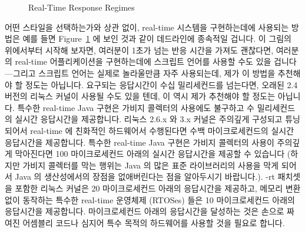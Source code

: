 \begin{figure}[tb]
\centering
{}
\caption{Real-Time Response Regimes}
\label{fig:advsync:Real-Time Response Regimes}
\end{figure}

어떤 스타일을 선택하는가와 상관 없이, real-time 시스템을 구현하는데에 사용되는
방법은 예를 들면
Figure~\ref{fig:advsync:Real-Time Response Regimes} 에 보인 것과 같이
데드라인에 종속적일 겁니다.
이 그림의 위에서부터 시작해 보자면, 여러분이 1초가 넘는 반응 시간을 가져도
괜찮다면, 여러분의 real-time 어플리케이션을 구현하는데에 스크립트 언어를 사용할
수도 있을 겁니다---그리고 스크립트 언어는 실제로 놀라울만큼 자주 사용되는데,
제가 이 방법을 추천해야 할 정도는 아닙니다.
요구되는 응답시간이 수십 밀리세컨드를 넘는다면, 오래된 2.4 버전의 리눅스 커널이
사용될 수도 있을 텐데, 이 역시 제가 추천해야 할 정도는 아닙니다.
특수한 real-time Java 구현은 가비지 콜렉터의 사용에도 불구하고 수 밀리세컨드의
실시간 응답시간을 제공합니다.
리눅스 2.6.x 와 3.x 커널은 주의깊게 구성되고 튜닝되어서 real-time 에 친화적인
하드웨어서 수행된다면 수백 마이크로세컨드의 실시간 응답시간을 제공합니다.
특수한 real-time Java 구현은 가비지 콜렉터의 사용이 주의깊게 막아진다면 100
마이크로세컨드 아래의 실시간 응답시간을 제공할 수 있습니다
(하지만 가비지 콜렉터를 막는 행위는 Java 의 많은 표준 라이브러리의 사용을 막게
되어서 Java 의 생산성에서의 장점을 없애버린다는 점을 알아두시기 바랍니다.).
-rt 패치셋을 포함한 리눅스 커널은 20 마이크로세컨드 아래의 응답시간을 제공하고,
메모리 변환 없이 동작하는 특수한 real-time 운영체제 (RTOSes) 들은 10
마이크로세컨드 아래의 응답시간을 제공합니다.
마이크로세컨드 아래의 응답시간을 달성하는 것은 손으로 짜여진 어셈블리 코드나
심지어 특수 목적의 하드웨어를 사용할 것을 필요로 합니다.
\iffalse

